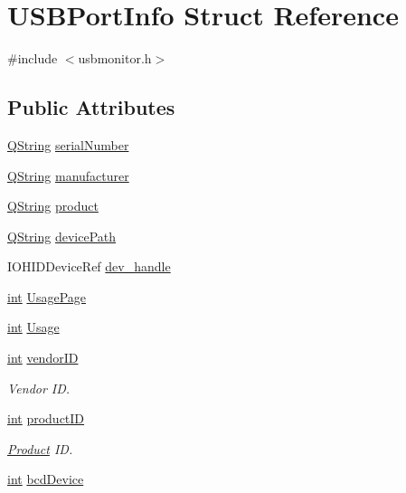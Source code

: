 \hypertarget{struct_u_s_b_port_info}{\section{U\-S\-B\-Port\-Info Struct Reference}
\label{struct_u_s_b_port_info}
}


{\ttfamily \#include $<$usbmonitor.\-h$>$}

\subsection*{Public Attributes}
\begin{DoxyCompactItemize}
\item 
\hyperlink{group___u_a_v_objects_plugin_gab9d252f49c333c94a72f97ce3105a32d}{Q\-String} \hyperlink{group___raw_h_i_d_plugin_ga2169d1d082c17498883e6c0497aecb94}{serial\-Number}
\item 
\hyperlink{group___u_a_v_objects_plugin_gab9d252f49c333c94a72f97ce3105a32d}{Q\-String} \hyperlink{group___raw_h_i_d_plugin_ga2ab42268838049538e60aa4a7aa3d305}{manufacturer}
\item 
\hyperlink{group___u_a_v_objects_plugin_gab9d252f49c333c94a72f97ce3105a32d}{Q\-String} \hyperlink{group___raw_h_i_d_plugin_ga8b2fb49e267664c4838e1205f57538d8}{product}
\item 
\hyperlink{group___u_a_v_objects_plugin_gab9d252f49c333c94a72f97ce3105a32d}{Q\-String} \hyperlink{group___raw_h_i_d_plugin_ga36eeebfb55ca4f88026f111f51793d18}{device\-Path}
\item 
I\-O\-H\-I\-D\-Device\-Ref \hyperlink{group___raw_h_i_d_plugin_gaa788f428f81fe24d5fd83a27fc3761c2}{dev\-\_\-handle}
\item 
\hyperlink{ioapi_8h_a787fa3cf048117ba7123753c1e74fcd6}{int} \hyperlink{group___raw_h_i_d_plugin_gaf3ad5590777743b25c22c4f07fd897c0}{Usage\-Page}
\item 
\hyperlink{ioapi_8h_a787fa3cf048117ba7123753c1e74fcd6}{int} \hyperlink{group___raw_h_i_d_plugin_ga8d2e5748b1fc39dcfaf4d3fc4aba9375}{Usage}
\item 
\hyperlink{ioapi_8h_a787fa3cf048117ba7123753c1e74fcd6}{int} \hyperlink{group___raw_h_i_d_plugin_ga506f2c8d425d78dd0ad899f8e5740729}{vendor\-I\-D}
\begin{DoxyCompactList}\small\item\em Vendor I\-D. \end{DoxyCompactList}\item 
\hyperlink{ioapi_8h_a787fa3cf048117ba7123753c1e74fcd6}{int} \hyperlink{group___raw_h_i_d_plugin_ga5bcd5b32d008f2c5cd5a6d3b7ec23b97}{product\-I\-D}
\begin{DoxyCompactList}\small\item\em \hyperlink{class_product}{Product} I\-D. \end{DoxyCompactList}\item 
\hyperlink{ioapi_8h_a787fa3cf048117ba7123753c1e74fcd6}{int} \hyperlink{group___raw_h_i_d_plugin_ga546927dd722c593c7acfca1cb045494d}{bcd\-Device}
\end{DoxyCompactItemize}



